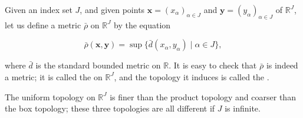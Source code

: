 \documentclass[../main.tex]{subfiles}
\begin{document}
\begin{definition}{}{}
Given an index set $J$, and given points $\mathbf{x} = (x_\alpha)_{\alpha \in J}$ and $\mathbf{y} = (y_\alpha)_{\alpha \in J}$ of $\mathbb{R}^J$, let us define a metric $\bar{\rho}$ on $\mathbb{R}^J$ by the equation

\[
\bar{\rho}(\mathbf{x}, \mathbf{y}) = \sup\{\bar{d}(x_\alpha, y_\alpha) \mid \alpha \in J\},
\]

where $\bar{d}$ is the standard bounded metric on $\mathbb{R}$. It is easy to check that $\bar{\rho}$ is indeed a metric; it is called the  on $\mathbb{R}^J$, and the topology it induces is called the .
\end{definition}

\begin{theorem}{}{}
The uniform topology on $\mathbb{R}^J$ is finer than the product topology and coarser than the box topology; these three topologies are all different if $J$ is infinite.
\end{theorem}
\end{document}
